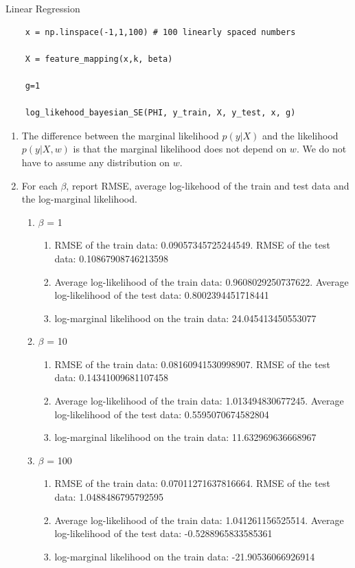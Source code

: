 \begin{task}{Linear Regression}
\begin{subtask}
\begin{lstlisting}
    x = np.linspace(-1,1,100) # 100 linearly spaced numbers
    
    X = feature_mapping(x,k, beta)
    
    g=1
    
    log_likehood_bayesian_SE(PHI, y_train, X, y_test, x, g)
\end{lstlisting}
\end{subtask}
\begin{subtask}
\begin{enumerate}
\item The difference between the marginal likelihood $p(y | X)$ and the likelihood $p(y |  X,w)$ is that the marginal likelihood does not depend on $w$. We do not have to assume any distribution on $w$.
\item For each $\beta$, report RMSE, average log-likehood of the train and test data and the log-marginal likelihood.
\begin{enumerate}
\item $\beta$ = 1
\begin{enumerate}
\item RMSE of the train data: 0.09057345725244549. RMSE of the test data: 0.10867908746213598
\item Average log-likelihood of the train data: 0.9608029250737622. Average log-likelihood of the test data: 0.8002394451718441
\item log-marginal likelihood on the train data: 24.045413450553077
\end{enumerate}
\item $\beta$ = 10
\begin{enumerate}
\item RMSE of the train data: 0.08160941530998907. RMSE of the test data: 0.14341009681107458
\item Average log-likelihood of the train data: 1.013494830677245. Average log-likelihood of the test data: 0.5595070674582804
\item log-marginal likelihood on the train data: 11.632969636668967
\end{enumerate}
\item $\beta$ = 100
\begin{enumerate}
\item RMSE of the train data: 0.07011271637816664. RMSE of the test data: 1.0488486795792595
\item Average log-likelihood of the train data: 1.041261156525514. Average log-likelihood of the test data: -0.5288965833585361
\item log-marginal likelihood on the train data: -21.90536066926914

\end{enumerate}
\end{enumerate}
\end{enumerate}
\end{subtask}
\end{task}
